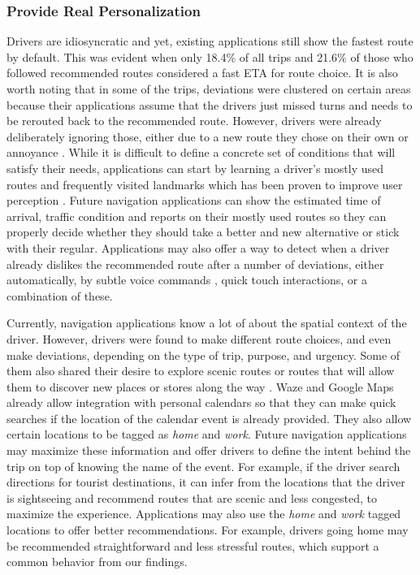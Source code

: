 \subsubsection{Provide Real Personalization}
Drivers are idiosyncratic and yet, existing applications still show the fastest route by default. This was evident when only 18.4\% of all trips and 21.6\% of those who followed recommended routes considered a fast ETA for route choice. It is also worth noting that in some of the trips, deviations were clustered on certain areas because their applications assume that the drivers just missed turns and needs to be rerouted back to the recommended route. However, drivers were already deliberately ignoring those, either due to a new route they chose on their own or annoyance \cite{Mahmud2009UserDrivers}. While it is difficult to define a concrete set of conditions that will satisfy their needs, applications can start by learning a driver's mostly used routes and frequently visited landmarks which has been proven to improve user perception \cite{Patel2006PersonalizingRoutes,Wang2014HierarchicalNavigation,Wu2015HybridSystems}. Future navigation applications can show the estimated time of arrival, traffic condition and reports on their mostly used routes so they can properly decide whether they should take a better and new alternative or stick with their regular. Applications may also offer a way to detect when a driver already dislikes the recommended route after a number of deviations, either automatically, by subtle voice commands \cite{Sakamoto2013VoiceManipulation}, quick touch interactions, or a combination of these.

Currently, navigation applications know a lot of about the spatial context of the driver. However, drivers were found to make different route choices, and even make deviations, depending on the type of trip, purpose, and urgency. Some of them also shared their desire to explore scenic routes or routes that will allow them to discover new places or stores along the way \cite{Quercia2014}. Waze and Google Maps already allow integration with personal calendars so that they can make quick searches if the location of the calendar event is already provided. They also allow certain locations to be tagged as \emph{home} and \emph{work}. Future navigation applications may maximize these information and offer drivers to define the intent behind the trip on top of knowing the name of the event. For example, if the driver search directions for tourist destinations, it can infer from the locations that the driver is sightseeing and recommend routes that are scenic and less congested, to maximize the experience. Applications may also use the \emph{home} and \emph{work} tagged locations to offer better recommendations. For example, drivers going home may be recommended straightforward and less stressful routes, which support a common behavior from our findings.

